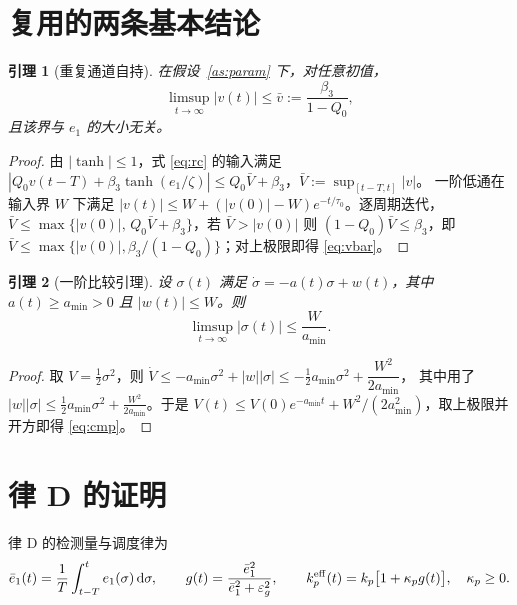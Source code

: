 \documentclass[11pt,a4paper]{article}
\newtheorem{lemma}{引理}
\theoremstyle{remark}
\newcommand{\st}{\operatorname{tanh}}
\begin{document}
\section{复用的两条基本结论}
\begin{lemma}[重复通道自持]\label{lem:v}
在假设~\ref{as:param} 下，对任意初值，
\begin{equation}
\limsup_{t\to\infty}|v(t)|\le \bar v:=\frac{\beta_3}{1-Q_0},
\label{eq:vbar}
\end{equation}
且该界与 $e_1$ 的大小无关。
\end{lemma}
\begin{proof}
由 $|\st|\le1$，式 \eqref{eq:rc} 的输入满足
$|Q_0v(t-T)+\beta_3\st(e_1/\zeta)|\le Q_0\bar V+\beta_3$，$\bar V:=\sup_{[t-T,t]}|v|$。
一阶低通在输入界 $W$ 下满足 $|v(t)|\le W+(|v(0)|-W)e^{-t/\tau_0}$。逐周期迭代，
$\bar V\le \max\{|v(0)|,\,Q_0\bar V+\beta_3\}$，若 $\bar V>|v(0)|$ 则
$(1-Q_0)\bar V\le\beta_3$，即 $\bar V\le\max\{|v(0)|,\beta_3/(1-Q_0)\}$；对上极限即得
\eqref{eq:vbar}。
\end{proof}

\begin{lemma}[一阶比较引理]\label{lem:cmp}
设 $\sigma(t)$ 满足 $\dot\sigma=-a(t)\sigma+w(t)$，其中 $a(t)\ge a_{\min}>0$ 且 $|w(t)|\le W$。则
\begin{equation}
\limsup_{t\to\infty}|\sigma(t)|\le\frac{W}{a_{\min}}.
\label{eq:cmp}
\end{equation}
\end{lemma}
\begin{proof}
取 $V=\tfrac12\sigma^2$，则
$\dot V\le -a_{\min}\sigma^2+|w||\sigma|\le-\tfrac12 a_{\min}\sigma^2+\dfrac{W^2}{2a_{\min}}$，
其中用了 $|w||\sigma|\le\tfrac12 a_{\min}\sigma^2+\frac{W^2}{2a_{\min}}$。于是
$V(t)\le V(0)e^{-a_{\min}t}+W^2/(2a_{\min}^2)$，取上极限并开方即得 \eqref{eq:cmp}。
\end{proof}

\section{律 D 的证明}\label{sec:lawd}
律 D 的检测量与调度律为
\begin{equation}
\bar e_1(t)=\frac1T\int_{t-T}^{t}e_1(\sigma)\,\mathrm d\sigma,\qquad
g(t)=\frac{\bar e_1^2}{\bar e_1^2+\varepsilon_g^2},\qquad
k_p^{\rm eff}(t)=k_p\big[1+\kappa_p g(t)\big],\quad \kappa_p\ge0 .
\label{eq:lawd}
\end{equation}
\end{document}
